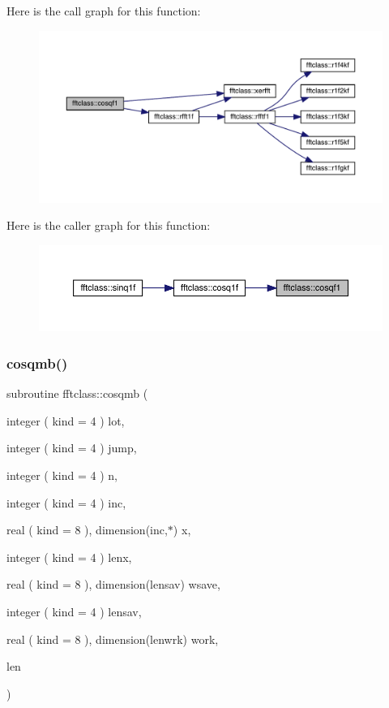 Here is the call graph for this function\+:\nopagebreak
\begin{figure}[H]
\begin{center}
\leavevmode
\includegraphics[width=350pt]{namespacefftclass_a894b76f80148bf5d923d558356a6cc1a_cgraph}
\end{center}
\end{figure}
Here is the caller graph for this function\+:\nopagebreak
\begin{figure}[H]
\begin{center}
\leavevmode
\includegraphics[width=350pt]{namespacefftclass_a894b76f80148bf5d923d558356a6cc1a_icgraph}
\end{center}
\end{figure}
\mbox{\label{namespacefftclass_a766146700483880896edee5e866f29a6}} 
\subsubsection{\texorpdfstring{cosqmb()}{cosqmb()}}
{\footnotesize\ttfamily subroutine fftclass\+::cosqmb (\begin{DoxyParamCaption}\item[{integer ( kind = 4 )}]{lot,  }\item[{integer ( kind = 4 )}]{jump,  }\item[{integer ( kind = 4 )}]{n,  }\item[{integer ( kind = 4 )}]{inc,  }\item[{real ( kind = 8 ), dimension(inc,$\ast$)}]{x,  }\item[{integer ( kind = 4 )}]{lenx,  }\item[{real ( kind = 8 ), dimension(lensav)}]{wsave,  }\item[{integer ( kind = 4 )}]{lensav,  }\item[{real ( kind = 8 ), dimension(lenwrk)}]{work,  }\item[{}]{len }\end{DoxyParamCaption})}

